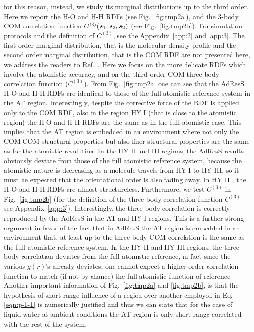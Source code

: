 \documentclass[aip,jcp,a4paper,reprint,onecolumn]{revtex4-1}
\newcommand{\redc}[1]{{\color{red} #1}}
\newcommand{\vect}[1]{\textbf{\textit{#1}}}
\newcommand{\corr}{C^{(3)}}
\begin{document}
for this reason, instead, we study its marginal distributions up to the third order.
Here we report the H-O and H-H RDFs (see Fig.~\ref{fig:tmp2a}), and the 3-body \redc{COM correlation function
$\corr(\vect s_1, \vect s_2, \vect s_2)$} (see Fig.~\ref{fig:tmp2b}). For simulation
protocols and the definition of \redc{$\corr$}, see the Appendix~\ref{app:2} and \ref{app:3}.
The first order marginal distribution, that is the molecular density profile and the second order marginal distribution, that is the COM RDF are not presented here, we address the readers to Ref.~. 
Here we focus on the more delicate RDFs which involve the atomistic accuracy, and on the third order COM three-body \redc{correlation function} ($\corr$). From Fig.~\ref{fig:tmp2a} one can see that
the AdResS H-O and H-H RDFs are identical to those of 
the full atomistic reference system in the AT region.
Interestingly, despite the corrective force of the RDF is applied only to the COM RDF, also in the region HY I (that is close to the atomistic region) the H-O and H-H RDFs are the same as in the full atomistic case.
This implies that the AT region
is embedded in an environment where not only the COM-COM structural properties but also finer structural
properties are the same as for the atomistic resolution.
In the HY II and III regions, the AdResS results obviously deviate from those
of the full atomistic reference system, because the atomistic nature 
is decreasing as a molecule travels from HY I to HY III, so it must be expected 
that the orientational order is also fading away. In HY III, the H-O and H-H
RDFs are almost structureless.
Furthermore, we test $\corr$ in Fig.~\ref{fig:tmp2b} (for the definition of the three-body \redc{correlation function $\corr$} see Appendix~\ref{app:3}).
Interestingly, the three-body correlation is correctly reproduced
by the AdResS in the AT and HY I  regions. This is a further strong argument in favor of the fact that in AdResS the AT region is embedded in an environment that, at least up to the three-body COM correlation is the same as the full atomistic reference system.
In the HY II and HY III regions, the three-body correlation deviates from the
full atomistic reference, \redc{in fact since the various $g(r)$'s already deviates, one cannot expect a higher order correlation function to match (if not by chance) the full atomistic function of reference}.
Another important information of Fig.~\ref{fig:tmp2a} and \ref{fig:tmp2b},
is that the hypothesis of short-range influence of a region over another employed in Eq.\ref{eqn:p-1-1} is numerically justified and thus we can state that for the case of liquid water at ambient conditions the AT region is only short-range
correlated with the rest of the system.
\end{document}
